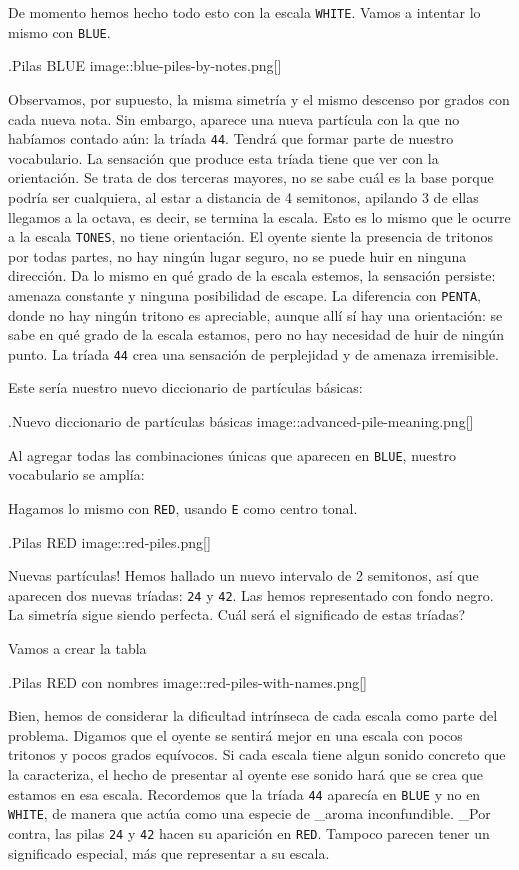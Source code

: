 \documentclass[]{article}
\begin{document}
De momento hemos hecho todo esto con la escala \texttt{WHITE}. Vamos a intentar lo mismo con \texttt{BLUE}.

.Pilas BLUE image::blue-piles-by-notes.png{[}{]}

Observamos, por supuesto, la misma simetría y el mismo descenso por grados con cada nueva nota. Sin embargo, aparece una nueva partícula con la que no habíamos contado aún: la tríada \texttt{44}. Tendrá que formar parte de nuestro vocabulario. La sensación que produce esta tríada tiene que ver con la orientación. Se trata de dos terceras mayores, no se sabe cuál es la base porque podría ser cualquiera, al estar a distancia de 4 semitonos, apilando 3 de ellas llegamos a la octava, es decir, se termina la escala. Esto es lo mismo que le ocurre a la escala \texttt{TONES}, no tiene orientación. El oyente siente la presencia de tritonos por todas partes, no hay ningún lugar seguro, no se puede huir en ninguna dirección. Da lo mismo en qué grado de la escala estemos, la sensación persiste: amenaza constante y ninguna posibilidad de escape. La diferencia con \texttt{PENTA}, donde no hay ningún tritono es apreciable, aunque allí sí hay una orientación: se sabe en qué grado de la escala estamos, pero no hay necesidad de huir de ningún punto. La tríada \texttt{44} crea una sensación de perplejidad y de amenaza irremisible.

Este sería nuestro nuevo diccionario de partículas básicas:

.Nuevo diccionario de partículas básicas image::advanced-pile-meaning.png{[}{]}

Al agregar todas las combinaciones únicas que aparecen en \texttt{BLUE}, nuestro vocabulario se amplía:

Hagamos lo mismo con \texttt{RED}, usando \texttt{E} como centro tonal.

.Pilas RED image::red-piles.png{[}{]}

Nuevas partículas! Hemos hallado un nuevo intervalo de 2 semitonos, así que aparecen dos nuevas tríadas: \texttt{24} y \texttt{42}. Las hemos representado con fondo negro. La simetría sigue siendo perfecta. Cuál será el significado de estas tríadas?

Vamos a crear la tabla

.Pilas RED con nombres image::red-piles-with-names.png{[}{]}

Bien, hemos de considerar la dificultad intrínseca de cada escala como parte del problema. Digamos que el oyente se sentirá mejor en una escala con pocos tritonos y pocos grados equívocos. Si cada escala tiene algun sonido concreto que la caracteriza, el hecho de presentar al oyente ese sonido hará que se crea que estamos en esa escala. Recordemos que la tríada \texttt{44} aparecía en \texttt{BLUE} y no en \texttt{WHITE}, de manera que actúa como una especie de \_aroma inconfundible. \_Por contra, las pilas \texttt{24} y \texttt{42} hacen su aparición en \texttt{RED}. Tampoco parecen tener un significado especial, más que representar a su escala.
\end{document}
